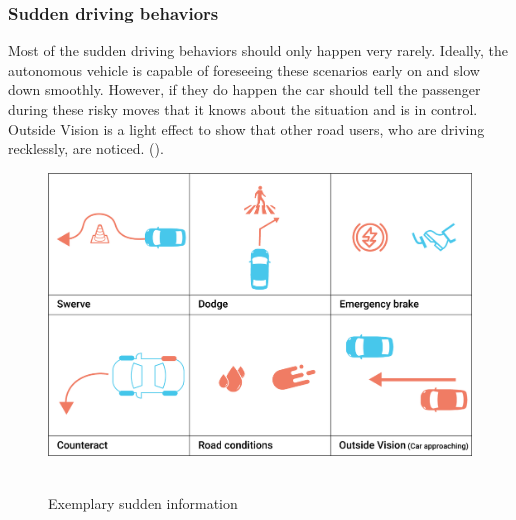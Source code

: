 \subsubsection{Sudden driving behaviors}
Most of the sudden driving behaviors should only happen very rarely. Ideally, the autonomous vehicle is capable of foreseeing these scenarios early on and slow down smoothly. However, if they do happen the car should tell the passenger during these risky moves that it knows about the situation and is in control. Outside Vision is a light effect to show that other road users, who are driving recklessly, are noticed. (\emph{}). 
\begin{figure}
    \includegraphics[width=1\textwidth]{fig/suddenmid.png}\hfill\
    \caption[Sudden Information]{Exemplary sudden information}
    \label{fig:sudden}
\end{figure}
